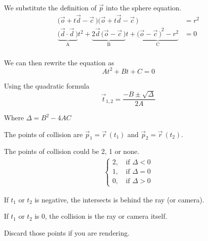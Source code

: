 \documentclass{article}
\begin{document}
We substitute the definition of \(\vec{p}\) into the sphere equation.
\begin{align*}
	\Big(\vec{o}+t\vec{d}-\vec{c}\,\Big)\Big(\vec{o}+t\vec{d}-\vec{c}\,\Big)&=r^2\\
	\underbrace{\Big(\vec{d}\cdot\vec{d}\,\Big)}_\text{A}t^2+
	\underbrace{2\vec{d}\,\Big(\vec{o}-\vec{c}\,\Big)}_\text{B}t+
	\underbrace{{\Big(\vec{o}-\vec{c}\,\Big)}^2-r^2}_\text{C}&=0\\
\end{align*}

We can then rewrite the equation as
\[
	At^2+Bt+C=0
\]

Using the quadratic formula
\[
	\vec{t}_{1,2}=\frac{-B\pm\sqrt{\Delta}}{2A}
\]

Where \(\Delta=B^2-4AC\)

The points of collision are \(\vec{p}_1=\vec{r}\,(t_1)\) and \(\vec{p}_2=\vec{r}\,(t_2)\).

The points of collision could be 2, 1 or none.
\begin{align*}
	\begin{cases}
		2,\quad\text{if }\Delta<0\\
		1,\quad\text{if }\Delta=0\\
		0,\quad\text{if }\Delta>0
	\end{cases}
\end{align*}

If \(t_1\) or \(t_2\) is negative, the intersects is behind the ray (or camera).

If \(t_1\) or \(t_2\) is \(0\), the collision is the ray or camera itself.

Discard those points if you are rendering.
\end{document}
